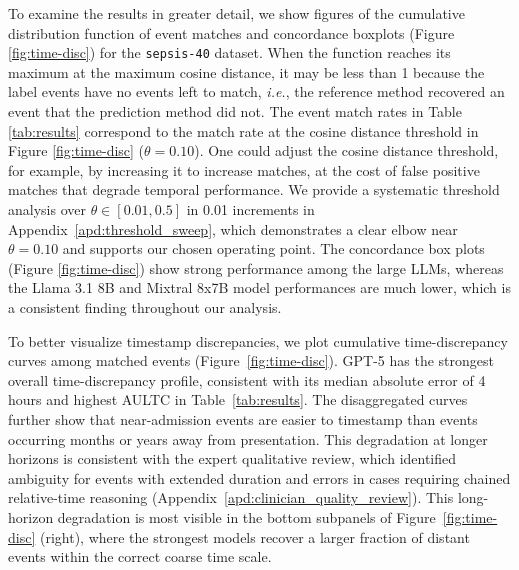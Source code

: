 \documentclass[pmlr,twocolumn,10pt]{jmlr} %
\begin{document}


To examine the results in greater detail, we show figures of the cumulative distribution function of event matches and concordance boxplots (Figure \ref{fig:time-disc}) for the \texttt{sepsis-40} dataset. 
When the function reaches its maximum at the maximum cosine distance, it may be less than 1 because the label events have no events left to match, \emph{i.e.}, the reference method recovered an event that the prediction method did not. 
The event match rates in Table \ref{tab:results} correspond to the match rate at the cosine distance threshold in Figure \ref{fig:time-disc} ($\theta=0.10$).  
One could adjust the cosine distance threshold, for example, by increasing it to increase matches, at the cost of false positive matches that degrade temporal performance. We provide a systematic threshold analysis over $\theta \in [0.01, 0.5]$ in 0.01 increments in Appendix~\ref{apd:threshold_sweep}, which demonstrates a clear elbow near $\theta=0.10$ and supports our chosen operating point.
The concordance box plots (Figure \ref{fig:time-disc}) show strong performance among the large LLMs, whereas the Llama 3.1 8B and Mixtral 8x7B model performances are much lower, which is a consistent finding throughout our analysis.

To better visualize timestamp discrepancies, we plot cumulative time-discrepancy curves among matched events (Figure~\ref{fig:time-disc}).
GPT-5 has the strongest overall time-discrepancy profile, consistent with its median absolute error of 4 hours and highest AULTC in Table~\ref{tab:results}.
The disaggregated curves further show that near-admission events are easier to timestamp than events occurring months or years away from presentation.
This degradation at longer horizons is consistent with the expert qualitative review, which identified ambiguity for events with extended duration and errors in cases requiring chained relative-time reasoning (Appendix~\ref{apd:clinician_quality_review}).
This long-horizon degradation is most visible in the bottom subpanels of Figure~\ref{fig:time-disc} (right), where the strongest models recover a larger fraction of distant events within the correct coarse time scale.
\end{document}

